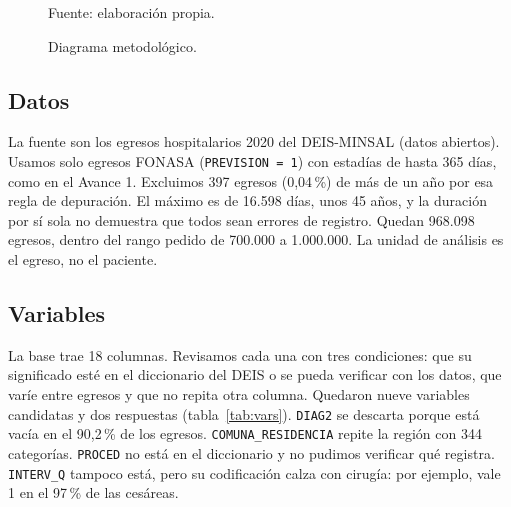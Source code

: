 \documentclass[10.5pt,a4paper,headings=small,abstract=false]{scrartcl}
\newcommand{\pct}{\,\%}
\begin{document}
\begin{figure}[!htb]
\centering
\caption{Diagrama metodológico.}
\label{fig:diagrama}
{\footnotesize\color{gris}Fuente: elaboración propia.\par}
\end{figure}

\subsection{Datos}

La fuente son los egresos hospitalarios 2020 del DEIS-MINSAL (datos abiertos). Usamos solo egresos FONASA (\texttt{PREVISION = 1}) con estadías de hasta 365 días, como en el Avance 1. Excluimos 397 egresos (0,04\pct{}) de más de un año por esa regla de depuración. El máximo es de 16.598 días, unos 45 años, y la duración por sí sola no demuestra que todos sean errores de registro. Quedan 968.098 egresos, dentro del rango pedido de 700.000 a 1.000.000. La unidad de análisis es el egreso, no el paciente.

\subsection{Variables}

La base trae 18 columnas. Revisamos cada una con tres condiciones: que su significado esté en el diccionario del DEIS o se pueda verificar con los datos, que varíe entre egresos y que no repita otra columna. Quedaron nueve variables candidatas y dos respuestas (tabla~\ref{tab:vars}). \texttt{DIAG2} se descarta porque está vacía en el 90,2\pct{} de los egresos. \texttt{COMUNA\_RESIDENCIA} repite la región con 344 categorías. \texttt{PROCED} no está en el diccionario y no pudimos verificar qué registra. \texttt{INTERV\_Q} tampoco está, pero su codificación calza con cirugía: por ejemplo, vale 1 en el 97\pct{} de las cesáreas.
\end{document}
